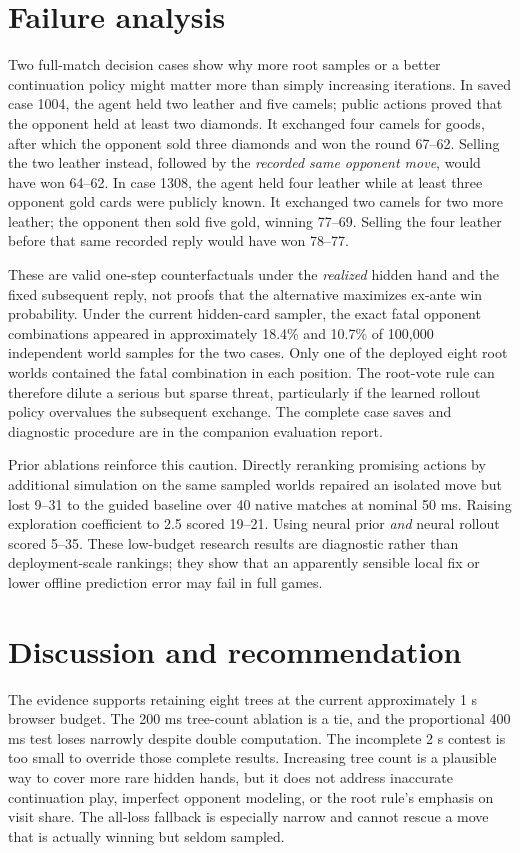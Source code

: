 \documentclass{article}
\begin{document}
\section{Failure analysis}

Two full-match decision cases show why more root samples or a better continuation policy might matter more than simply increasing iterations. In saved case 1004, the agent held two leather and five camels; public actions proved that the opponent held at least two diamonds. It exchanged four camels for goods, after which the opponent sold three diamonds and won the round 67--62. Selling the two leather instead, followed by the \emph{recorded same opponent move}, would have won 64--62. In case 1308, the agent held four leather while at least three opponent gold cards were publicly known. It exchanged two camels for two more leather; the opponent then sold five gold, winning 77--69. Selling the four leather before that same recorded reply would have won 78--77.

These are valid one-step counterfactuals under the \emph{realized} hidden hand and the fixed subsequent reply, not proofs that the alternative maximizes ex-ante win probability. Under the current hidden-card sampler, the exact fatal opponent combinations appeared in approximately 18.4\% and 10.7\% of 100{,}000 independent world samples for the two cases. Only one of the deployed eight root worlds contained the fatal combination in each position. The root-vote rule can therefore dilute a serious but sparse threat, particularly if the learned rollout policy overvalues the subsequent exchange. The complete case saves and diagnostic procedure are in the companion evaluation report.

Prior ablations reinforce this caution. Directly reranking promising actions by additional simulation on the same sampled worlds repaired an isolated move but lost 9--31 to the guided baseline over 40 native matches at nominal 50 ms. Raising exploration coefficient to 2.5 scored 19--21. Using neural prior \emph{and} neural rollout scored 5--35. These low-budget research results are diagnostic rather than deployment-scale rankings; they show that an apparently sensible local fix or lower offline prediction error may fail in full games.

\section{Discussion and recommendation}

The evidence supports retaining eight trees at the current approximately 1 s browser budget. The 200 ms tree-count ablation is a tie, and the proportional 400 ms test loses narrowly despite double computation. The incomplete 2 s contest is too small to override those complete results. Increasing tree count is a plausible way to cover more rare hidden hands, but it does not address inaccurate continuation play, imperfect opponent modeling, or the root rule's emphasis on visit share. The all-loss fallback is especially narrow and cannot rescue a move that is actually winning but seldom sampled.
\end{document}
